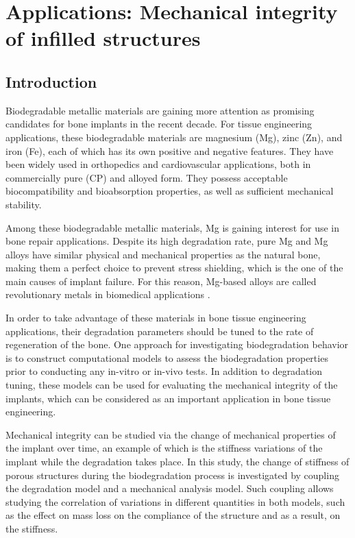 \chapter{Applications: Mechanical integrity of infilled structures}\label{ch:infill}

\section{Introduction}

Biodegradable metallic materials are gaining more attention as promising candidates for bone implants in the recent decade. For tissue engineering applications, these biodegradable materials are magnesium (Mg), zinc (Zn), and iron (Fe), each of which has its own positive and negative features. They have been widely used in orthopedics and cardiovascular applications, both in commercially pure (CP) and alloyed form. They possess acceptable biocompatibility and bioabsorption properties, as well as sufficient mechanical stability. 

Among these biodegradable metallic materials, Mg is gaining interest for use in bone repair applications. Despite its high degradation rate, pure Mg and Mg alloys have similar physical and mechanical properties as the natural bone, making them a perfect choice to prevent stress shielding, which is the one of the main causes of implant failure. For this reason, Mg-based alloys are called revolutionary metals in biomedical applications \cite{Shuai2019}. 

In order to take advantage of these materials in bone tissue engineering applications, their degradation parameters should be tuned to the rate of regeneration of the bone. One approach for investigating biodegradation behavior is to construct computational models to assess the biodegradation properties prior to conducting any in-vitro or in-vivo tests. In addition to degradation tuning, these models can be used for evaluating the mechanical integrity of the implants, which can be considered as an important application in bone tissue engineering. 

Mechanical integrity can be studied via the change of mechanical properties of the implant over time, an example of which is the stiffness variations of the implant while the degradation takes place. In this study, the change of stiffness of porous structures during the biodegradation process is investigated by coupling the degradation model and a mechanical analysis model. Such coupling allows studying the correlation of variations in different quantities in both models, such as the effect on mass loss on the compliance of the structure and as a result, on the stiffness. 

